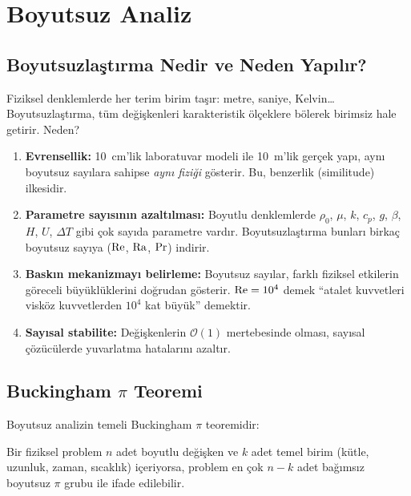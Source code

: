 \chapter{Boyutsuz Analiz}
\label{ch:boyutsuz}

\section{Boyutsuzlaştırma Nedir ve Neden Yapılır?}
\label{sec:boyutsuz_neden}

Fiziksel denklemlerde her terim birim taşır: metre, saniye, Kelvin\ldots{} Boyutsuzlaştırma, tüm değişkenleri karakteristik ölçeklere bölerek birimsiz hale getirir. Neden?

\begin{enumerate}
    \item \textbf{Evrensellik:} 10~cm'lik laboratuvar modeli ile 10~m'lik gerçek yapı, aynı boyutsuz sayılara sahipse \textit{aynı fiziği} gösterir. Bu, benzerlik (similitude) ilkesidir.

    \item \textbf{Parametre sayısının azaltılması:} Boyutlu denklemlerde $\rho_0$, $\mu$, $k$, $c_p$, $g$, $\beta$, $H$, $U$, $\Delta T$ gibi çok sayıda parametre vardır. Boyutsuzlaştırma bunları birkaç boyutsuz sayıya ($\mathrm{Re}$, $\mathrm{Ra}$, $\mathrm{Pr}$) indirir.

    \item \textbf{Baskın mekanizmayı belirleme:} Boyutsuz sayılar, farklı fiziksel etkilerin göreceli büyüklüklerini doğrudan gösterir. $\mathrm{Re} = 10^4$ demek ``atalet kuvvetleri visköz kuvvetlerden $10^4$ kat büyük'' demektir.

    \item \textbf{Sayısal stabilite:} Değişkenlerin $\mathcal{O}(1)$ mertebesinde olması, sayısal çözücülerde yuvarlatma hatalarını azaltır.
\end{enumerate}


\section{Buckingham $\pi$ Teoremi}
\label{sec:buckingham}

Boyutsuz analizin temeli Buckingham $\pi$ teoremidir:

\begin{theorem}
Bir fiziksel problem $n$ adet boyutlu değişken ve $k$ adet temel birim (kütle, uzunluk, zaman, sıcaklık) içeriyorsa, problem en çok $n - k$ adet bağımsız boyutsuz $\pi$ grubu ile ifade edilebilir.
\end{theorem}

